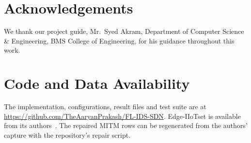 \section*{Acknowledgements}
We thank our project guide, Mr.\ Syed Akram, Department of Computer Science \& Engineering, BMS College of Engineering, for his guidance throughout this work.

\section*{Code and Data Availability}
The implementation, configurations, result files and test suite are at \url{https://github.com/TheAaryanPrakash/FL-IDS-SDN}. Edge-IIoTset is available from its authors~\cite{ferrag2022}. The repaired MITM rows can be regenerated from the authors' capture with the repository's repair script.
